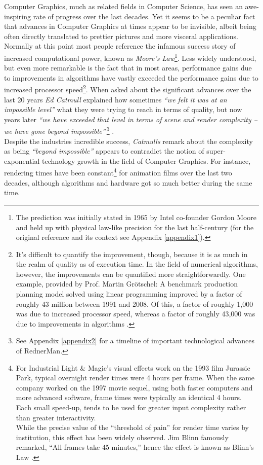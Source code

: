 Computer Graphics, much as related fields in Computer Science, has seen an awe-inspiring rate of progress over the last decades.
Yet it seems to be a peculiar fact that advances in Computer Graphics at times appear to be invisible, albeit being often directly translated to prettier pictures and more visceral applications.\\
Normally at this point most people reference the infamous success story of increased computational power, known as \textit{Moore’s Law}\footnote{ The prediction was initially stated in 1965 by Intel co-founder Gordon Moore and held up with physical law-like precision for the last half-century (for the original reference and its context see Appendix \ref{appendix1}).}.
Less widely understood, but even more remarkable is the fact that in most areas, performance gains due to improvements in algorithms have vastly exceeded the performance gains due to increased processor speed\footnote{ It’s difficult to quantify the improvement, though, because it is as much in the realm of quality as of execution time.
In the field of numerical algorithms, however, the improvements can be quantified more straightforwardly.
One example, provided by Prof. Martin Grötschel: A benchmark production planning model solved using linear programming improved by a factor of roughly 43 million between 1991 and 2008.
Of this, a factor of roughly 1,000 was due to increased processor speed, whereas a factor of roughly 43,000 was due to improvements in algorithms \citep[][cf. p.71]{Holdren2010}.}.
When asked about the significant advances over the last 20 years \textit{Ed Catmull} explained how sometimes \textit{``we felt it was at an impossible level''} what they were trying to reach in terms of quality, but now years later \textit{``we have exceeded that level in terms of scene and render complexity -- we have gone beyond impossible''}\,\footnote{ See Appendix \ref{appendix2} for a timeline of important technological advances of RednerMan\textsuperscript{\textregistered}.} \citep[Edwin „Ed“ Catmull, president of Walt Disney \& Pixar Animation Studios, citet in:][]{Seymour2008}.\\
Despite the industries incredible success, \textit{Catmulls} remark about the complexity as being \textit{“beyond impossible”} appears to contradict the notion of super-exponential technology growth in the field of Computer Graphics.
For instance, rendering times have been constant\footnote{ For Industrial Light \& Magic’s visual effects work on the 1993 film Jurassic Park, typical overnight render times were 4 hours per frame. When the same company worked on the 1997 movie sequel, using both faster computers and more advanced software, frame times were typically an identical 4 hours. Each small speed-up, tends to be used for greater input complexity rather than greater interactivity.\\ While the precise value of the “threshold of pain” for render time varies by institution, this effect has been widely observed. Jim Blinn famously remarked, “All frames take 45 minutes,” hence the effect is known as Blinn’s Law \citep[][cf. Chapter 3]{Enderton2011}.}  for animation films over the last two decades, although algorithms and hardware got so much better during the same time.
